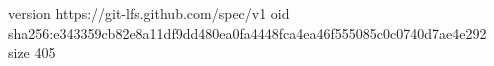 version https://git-lfs.github.com/spec/v1
oid sha256:e343359cb82e8a11df9dd480ea0fa4448fca4ea46f555085c0c0740d7ae4e292
size 405

